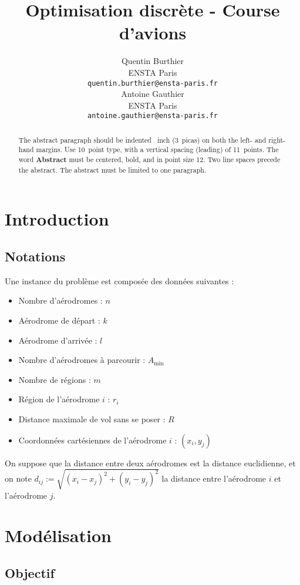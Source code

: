 \documentclass{article}
\title{Optimisation discrète - Course d'avions}
\author{%
  Quentin Burthier
  \\
  ENSTA Paris\\
  \texttt{quentin.burthier@ensta-paris.fr} \\
  \And
  Antoine Gauthier \\
  ENSTA Paris \\
  \texttt{antoine.gauthier@ensta-paris.fr} \\
}
\newcommand{\dij}{d_{ij}}
\newcommand{\Amin}{A_\text{min}}
\begin{document}
\maketitle

\begin{abstract}
  The abstract paragraph should be indented ~inch (3~picas) on
  both the left- and right-hand margins. Use 10~point type, with a vertical
  spacing (leading) of 11~points.  The word \textbf{Abstract} must be centered,
  bold, and in point size 12. Two line spaces precede the abstract. The abstract
  must be limited to one paragraph.
\end{abstract}

\section{Introduction}

\subsection{Notations}

Une instance du problème est composée des données suivantes :
\begin{itemize}
  \item Nombre d'aérodromes : $n$
  \item Aérodrome de départ : $k$
  \item Aérodrome d'arrivée : $l$
  \item Nombre d'aérodromes à parcourir : $\Amin$
  \item Nombre de régions : $m$
  \item Région de l'aérodrome $i$ : $r_i$
  \item Distance maximale de vol sans se poser : $R$
  \item Coordonnées cartésiennes de l'aérodrome $i$ : $(x_i, y_j)$
\end{itemize}

On suppose que la distance entre deux aérodromes est la distance euclidienne, et 
on note $\dij := \sqrt{(x_i - x_j)^2 + (y_i - y_j)^2}$ la distance entre 
l'aérodrome $i$ et l'aérodrome $j$.

\section{Modélisation}

\subsection{Objectif}
\end{document}
